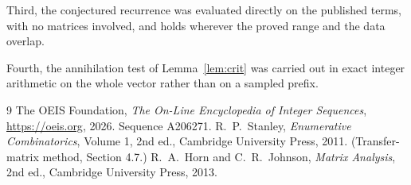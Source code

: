 \documentclass[11pt,a4paper]{article}
\theoremstyle{plain}
\theoremstyle{definition}
\begin{document}
Third, the conjectured recurrence was evaluated directly on the published terms, with no
matrices involved, and holds wherever the proved range and the data overlap.

Fourth, the annihilation test of Lemma~\ref{lem:crit} was carried out in exact integer
arithmetic on the whole vector rather than on a sampled prefix.

\begin{thebibliography}{9}
 The OEIS Foundation, \emph{The On-Line Encyclopedia of Integer
Sequences}, \url{https://oeis.org}, 2026. Sequence A206271.
 R.~P.~Stanley, \emph{Enumerative Combinatorics}, Volume 1, 2nd ed.,
Cambridge University Press, 2011. (Transfer-matrix method, Section 4.7.)
 R.~A.~Horn and C.~R.~Johnson, \emph{Matrix Analysis}, 2nd ed., Cambridge
University Press, 2013.
\end{thebibliography}
\end{document}
